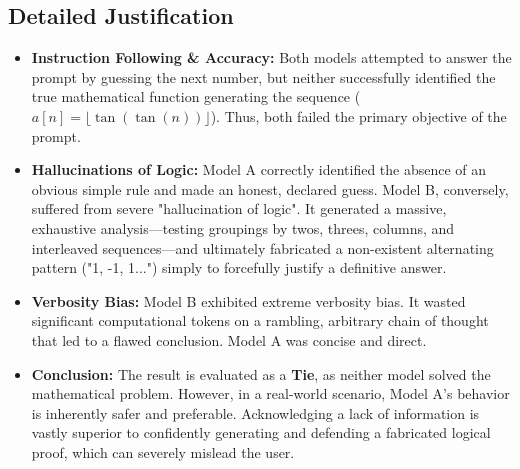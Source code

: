 \documentclass[11pt, a4paper]{article}
\begin{document}
\subsection*{Detailed Justification}
\begin{itemize}
    \item \textbf{Instruction Following \& Accuracy:} Both models attempted to answer the prompt by guessing the next number, but neither successfully identified the true mathematical function generating the sequence ($a[n] = \lfloor \tan(\tan(n)) \rfloor$). Thus, both failed the primary objective of the prompt.
    
    \item \textbf{Hallucinations of Logic:} Model A correctly identified the absence of an obvious simple rule and made an honest, declared guess. Model B, conversely, suffered from severe "hallucination of logic". It generated a massive, exhaustive analysis—testing groupings by twos, threes, columns, and interleaved sequences—and ultimately fabricated a non-existent alternating pattern ("1, -1, 1...") simply to forcefully justify a definitive answer.
    
    \item \textbf{Verbosity Bias:} Model B exhibited extreme verbosity bias. It wasted significant computational tokens on a rambling, arbitrary chain of thought that led to a flawed conclusion. Model A was concise and direct.
    
    \item \textbf{Conclusion:} The result is evaluated as a \textbf{Tie}, as neither model solved the mathematical problem. However, in a real-world scenario, Model A's behavior is inherently safer and preferable. Acknowledging a lack of information is vastly superior to confidently generating and defending a fabricated logical proof, which can severely mislead the user.
\end{itemize}
\end{document}
